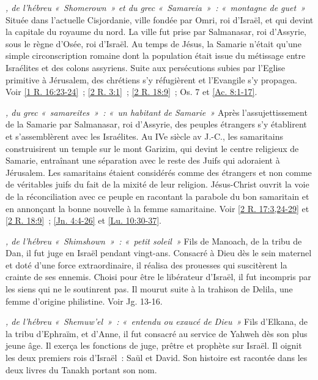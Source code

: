 \begin{multicols}{2}
\textit{, de l'hébreu «~Shomerown~» et du grec «~Samareia~»~: «~montagne de guet~»}\newline
Située dans l'actuelle Cisjordanie, ville fondée par Omri, roi d'Israël, et qui devint la capitale du royaume du nord. La ville fut prise par Salmanasar, roi d'Assyrie, sous le règne d'Osée, roi d'Israël. Au temps de Jésus, la Samarie n'était qu'une simple circonscription romaine dont la population était issue du métissage entre Israélites et des colons assyriens. Suite aux persécutions subies par l'Eglise primitive à Jérusalem, des chrétiens s'y réfugièrent et l'Evangile s'y propagea.\newline
Voir \vref{1 R. 16:23-24}~; \vref{2 R. 3:1}~; \vref{2 R. 18:9}~; Os. 7 et \vref{Ac. 8:1-17}.

\textit{, du grec «~samareites~»~: «~un habitant de Samarie~»}\newline
Après l'assujettissement de la Samarie par Salmanasar, roi d'Assyrie, des peuples étrangers s'y établirent et s'assemblèrent avec les Israélites. Au IVe siècle av J.-C., les samaritains construisirent un temple sur le mont Garizim, qui devint le centre religieux de Samarie, entraînant une séparation avec le reste des Juifs qui adoraient à Jérusalem. Les samaritains étaient considérés comme des étrangers et non comme de véritables juifs du fait de la mixité de leur religion. Jésus-Christ ouvrit la voie de la réconciliation avec ce peuple en racontant la parabole du bon samaritain et en annonçant la bonne nouvelle à la femme samaritaine.\newline
Voir \vref{2 R. 17:3,24-29} et \vref{2 R. 18:9}~; \vref{Jn. 4:4-26} et \vref{Lu. 10:30-37}.

\textit{, de l'hébreu «~Shimshown~»~: «~petit soleil~»}\newline
Fils de Manoach, de la tribu de Dan, il fut juge en Israël pendant vingt-ans. Consacré à Dieu dès le sein maternel et doté d'une force extraordinaire, il réalisa des prouesses qui suscitèrent la crainte de ses ennemis. Choisi pour être le libérateur d'Israël, il fut incompris par les siens qui ne le soutinrent pas. Il mourut suite à la trahison de Delila, une femme d'origine philistine. Voir Jg. 13-16.

\textit{, de l'hébreu «~Shemuw'el~»~: «~entendu ou exaucé de Dieu~»}\newline
Fils d'Elkana, de la tribu d'Ephraïm, et d'Anne, il fut consacré au service de Yahweh dès son plus jeune âge. Il exerça les fonctions de juge, prêtre et prophète sur Israël. Il oignit les deux premiers rois d'Israël~: Saül et David. Son histoire est racontée dans les deux livres du Tanakh portant son nom.


\end{multicols}
